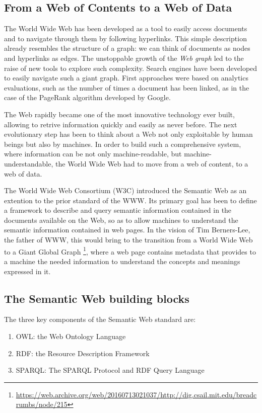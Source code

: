 \documentclass[%
    corpo=13.5pt,
    twoside,
    oldstyle,
    tipotesi=magistrale,
    greek,
    evenboxes
]{toptesi}
\begin{document}
\subsection{From a Web of Contents to a Web of Data}

The World Wide Web has been developed as a tool to easily access
documents and to navigate through them by following hyperlinks.
This simple description already resembles the structure of a graph: we can
think of documents as nodes and hyperlinks as edges. The unstoppable growth
of the \emph{Web graph} led to the raise of new tools to explore such
complexity. Search engines have been developed to easily navigate such a
giant graph. First approaches were based on analytics evaluations,
such as the number of times a document has been linked, as in the case of the
PageRank \cite{page1999} algorithm developed by Google.
\newline

The Web rapidly became one of the most innovative technology ever built,
allowing to retrive information quickly and easily as never before.
The next evolutionary step has been to think about a Web not only exploitable by
human beings but also by machines. In order to build such a comprehensive
system, where information can be not only machine-readable, but
machine-understandable, the World Wide Web had to move from a web of content, to
a web of data.
\newline

The World Wide Web Consortium (W3C) introduced the Semantic Web as an extention
to the prior standard of the WWW. Its primary goal has been
to define a framework to describe and query semantic information contained
in the documents available on the Web, so as to allow machines to understand
the semantic information contained in web pages. In the vision of Tim
Berners-Lee, the father of WWW, this would bring to the transition from a
World Wide Web to a Giant Global Graph
\footnote{\url{https://web.archive.org/web/20160713021037/http://dig.csail.mit.edu/breadcrumbs/node/215}},
where a web page contains metadata that provides to a machine the needed
information to understand the concepts and meanings expressed in it.


\subsection{The Semantic Web building blocks}
\label{subsec:semanticweb}

The three key components of the Semantic Web standard are:
\begin{enumerate}
\item OWL: the Web Ontology Language\cite{mcguinness2004}
\item RDF: the Resource Description Framework\cite{lassila1998}
\item SPARQL: The SPARQL Protocol and RDF Query Language\cite{ducharme2013}
\end{enumerate}
\bigskip
\end{document}
